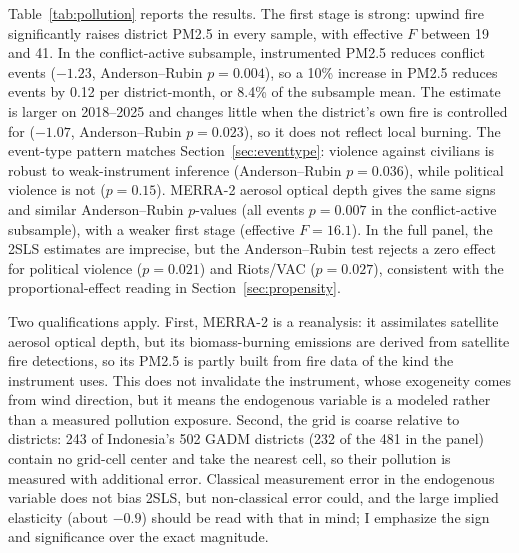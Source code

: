 \documentclass[12pt]{article}
\begin{document}
Table~\ref{tab:pollution} reports the results. The first stage is strong: upwind fire significantly raises district PM2.5 in every sample, with effective $F$ between 19 and 41. In the conflict-active subsample, instrumented PM2.5 reduces conflict events ($-1.23$, Anderson--Rubin $p=0.004$), so a 10\% increase in PM2.5 reduces events by 0.12 per district-month, or 8.4\% of the subsample mean. The estimate is larger on 2018--2025 and changes little when the district's own fire is controlled for ($-1.07$, Anderson--Rubin $p=0.023$), so it does not reflect local burning. The event-type pattern matches Section~\ref{sec:eventtype}: violence against civilians is robust to weak-instrument inference (Anderson--Rubin $p=0.036$), while political violence is not ($p=0.15$). MERRA-2 aerosol optical depth gives the same signs and similar Anderson--Rubin $p$-values (all events $p=0.007$ in the conflict-active subsample), with a weaker first stage (effective $F = 16.1$). In the full panel, the 2SLS estimates are imprecise, but the Anderson--Rubin test rejects a zero effect for political violence ($p=0.021$) and Riots/VAC ($p=0.027$), consistent with the proportional-effect reading in Section~\ref{sec:propensity}.

Two qualifications apply. First, MERRA-2 is a reanalysis: it assimilates satellite aerosol optical depth, but its biomass-burning emissions are derived from satellite fire detections, so its PM2.5 is partly built from fire data of the kind the instrument uses. This does not invalidate the instrument, whose exogeneity comes from wind direction, but it means the endogenous variable is a modeled rather than a measured pollution exposure. Second, the grid is coarse relative to districts: 243 of Indonesia's 502 GADM districts (232 of the 481 in the panel) contain no grid-cell center and take the nearest cell, so their pollution is measured with additional error. Classical measurement error in the endogenous variable does not bias 2SLS, but non-classical error could, and the large implied elasticity (about $-0.9$) should be read with that in mind; I emphasize the sign and significance over the exact magnitude.
\end{document}
